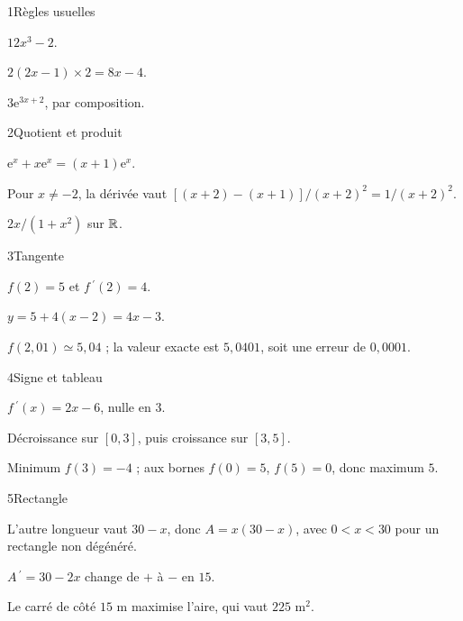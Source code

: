 \begin{corrige}{1}{Règles usuelles}
\begin{questions}
\item $12x^3-2$.
\item $2(2x-1)\times2=8x-4$.
\item $3\mathrm e^{3x+2}$, par composition.
\end{questions}
\end{corrige}
\begin{corrige}{2}{Quotient et produit}
\begin{questions}
\item $\mathrm e^x+x\mathrm e^x=(x+1)\mathrm e^x$.
\item Pour $x\ne-2$, la dérivée vaut $[(x+2)-(x+1)]/(x+2)^2=1/(x+2)^2$.
\item $2x/(1+x^2)$ sur $\mathbb{R}$.
\end{questions}
\end{corrige}
\begin{corrige}{3}{Tangente}
\begin{questions}
\item $f(2)=5$ et $f\,\!^{\prime}(2)=4$.
\item $y=5+4(x-2)=4x-3$.
\item $f(2{,}01)\simeq5{,}04$ ; la valeur exacte est $5{,}0401$, soit une erreur de $0{,}0001$.
\end{questions}
\end{corrige}
\begin{corrige}{4}{Signe et tableau}
\begin{questions}
\item $f\,\!^{\prime}(x)=2x-6$, nulle en $3$.
\item Décroissance sur $[0,3]$, puis croissance sur $[3,5]$.
\item Minimum $f(3)=-4$ ; aux bornes $f(0)=5$, $f(5)=0$, donc maximum $5$.
\end{questions}
\end{corrige}
\begin{corrige}{5}{Rectangle}
\begin{questions}
\item L’autre longueur vaut $30-x$, donc $A=x(30-x)$, avec $0<x<30$ pour un rectangle non dégénéré.
\item $A\,\!^{\prime}=30-2x$ change de $+$ à $-$ en $15$.
\item Le carré de côté $15$ m maximise l’aire, qui vaut $225$ m$^2$.
\end{questions}
\end{corrige}
